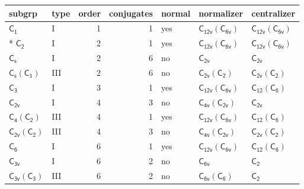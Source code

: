 \documentclass[10pt,a4paper]{article}
\numberwithin{equation}{section}
\newcommand{\grp}[1]{\mathsf{#1}}
\begin{document}
{\small\begin{longtable}{@{}llrrlll@{}}\toprule
subgrp & type & order & conjugates & normal & normalizer & centralizer\\\midrule\endhead
\bottomrule\endfoot\endlastfoot
\href{../../../rotation/data/pdf/C1.pdf}{$\grp{C_{1}}$} & I & 1 & 1 & yes & \href{C12v-C6v.pdf}{$\grp{C_{12v}}(\grp{C_{6v}})$} & \href{C12v-C6v.pdf}{$\grp{C_{12v}}(\grp{C_{6v}})$}\\*
\href{../../../rotation/data/pdf/C2.pdf}{$\grp{C_{2}}$} & I & 2 & 1 & yes & \href{C12v-C6v.pdf}{$\grp{C_{12v}}(\grp{C_{6v}})$} & \href{C12v-C6v.pdf}{$\grp{C_{12v}}(\grp{C_{6v}})$}\\
\href{../../../rotation/data/pdf/C1v.pdf}{$\grp{C_{s}}$} & I & 2 & 6 & no & \href{../../../rotation/data/pdf/C2v.pdf}{$\grp{C_{2v}}$} & \href{../../../rotation/data/pdf/C2v.pdf}{$\grp{C_{2v}}$}\\
\href{C1v-C1.pdf}{$\grp{C_{s}}(\grp{C_{1}})$} & III & 2 & 6 & no & \href{C2v-C2.pdf}{$\grp{C_{2v}}(\grp{C_{2}})$} & \href{C2v-C2.pdf}{$\grp{C_{2v}}(\grp{C_{2}})$}\\
\href{../../../rotation/data/pdf/C3.pdf}{$\grp{C_{3}}$} & I & 3 & 1 & yes & \href{C12v-C6v.pdf}{$\grp{C_{12v}}(\grp{C_{6v}})$} & \href{C12-C6.pdf}{$\grp{C_{12}}(\grp{C_{6}})$}\\
\href{../../../rotation/data/pdf/C2v.pdf}{$\grp{C_{2v}}$} & I & 4 & 3 & no & \href{C4v-C2v.pdf}{$\grp{C_{4v}}(\grp{C_{2v}})$} & \href{../../../rotation/data/pdf/C2v.pdf}{$\grp{C_{2v}}$}\\
\href{C4-C2.pdf}{$\grp{C_{4}}(\grp{C_{2}})$} & III & 4 & 1 & yes & \href{C12v-C6v.pdf}{$\grp{C_{12v}}(\grp{C_{6v}})$} & \href{C12-C6.pdf}{$\grp{C_{12}}(\grp{C_{6}})$}\\
\href{C2v-C2.pdf}{$\grp{C_{2v}}(\grp{C_{2}})$} & III & 4 & 3 & no & \href{C4v-C2v.pdf}{$\grp{C_{4v}}(\grp{C_{2v}})$} & \href{C2v-C2.pdf}{$\grp{C_{2v}}(\grp{C_{2}})$}\\
\href{../../../rotation/data/pdf/C6.pdf}{$\grp{C_{6}}$} & I & 6 & 1 & yes & \href{C12v-C6v.pdf}{$\grp{C_{12v}}(\grp{C_{6v}})$} & \href{C12-C6.pdf}{$\grp{C_{12}}(\grp{C_{6}})$}\\
\href{../../../rotation/data/pdf/C3v.pdf}{$\grp{C_{3v}}$} & I & 6 & 2 & no & \href{../../../rotation/data/pdf/C6v.pdf}{$\grp{C_{6v}}$} & \href{../../../rotation/data/pdf/C2.pdf}{$\grp{C_{2}}$}\\
\href{C3v-C3.pdf}{$\grp{C_{3v}}(\grp{C_{3}})$} & III & 6 & 2 & no & \href{C6v-C6.pdf}{$\grp{C_{6v}}(\grp{C_{6}})$} & \href{../../../rotation/data/pdf/C2.pdf}{$\grp{C_{2}}$}\\

\end{longtable}}
\end{document}
